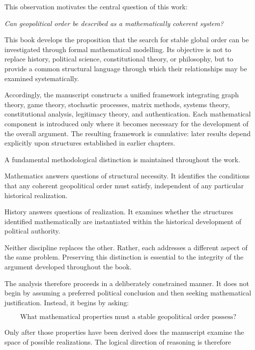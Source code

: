\documentclass[11pt,openany]{book}
\theoremstyle{plain}
\theoremstyle{definition}
\begin{document}
This observation motivates the central question of this work:

\begin{center}
\emph{
Can geopolitical order be described as a mathematically coherent system?
}
\end{center}

This book develops the proposition that the search for stable global order can be investigated through formal mathematical modelling. Its objective is not to replace history, political science, constitutional theory, or philosophy, but to provide a common structural language through which their relationships may be examined systematically.

Accordingly, the manuscript constructs a unified framework integrating graph theory, game theory, stochastic processes, matrix methods, systems theory, constitutional analysis, legitimacy theory, and authentication. Each mathematical component is introduced only where it becomes necessary for the development of the overall argument. The resulting framework is cumulative: later results depend explicitly upon structures established in earlier chapters.

A fundamental methodological distinction is maintained throughout the work.

Mathematics answers questions of structural necessity. It identifies the conditions that any coherent geopolitical order must satisfy, independent of any particular historical realization.

History answers questions of realization. It examines whether the structures identified mathematically are instantiated within the historical development of political authority.

Neither discipline replaces the other. Rather, each addresses a different aspect of the same problem. Preserving this distinction is essential to the integrity of the argument developed throughout the book.

The analysis therefore proceeds in a deliberately constrained manner. It does not begin by assuming a preferred political conclusion and then seeking mathematical justification. Instead, it begins by asking:

\[
\boxed{
\text{What mathematical properties must a stable geopolitical order possess?}
}
\]

Only after those properties have been derived does the manuscript examine the space of possible realizations. The logical direction of reasoning is therefore
\end{document}
